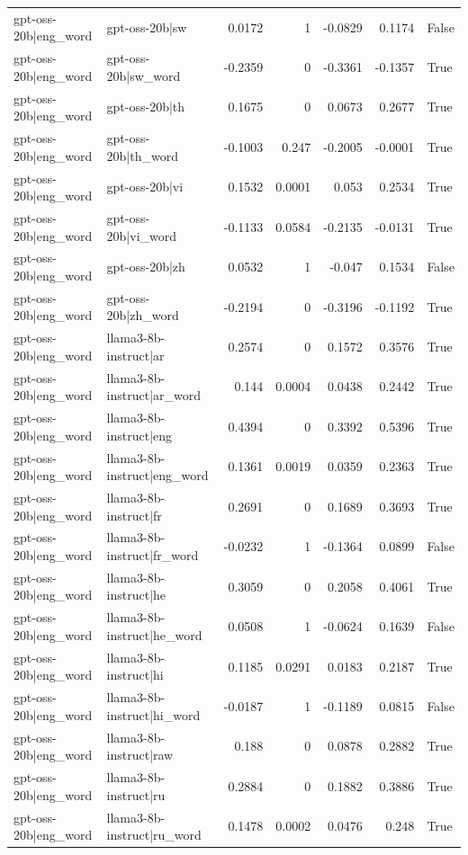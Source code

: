 \begin{table}
\begin{tabular}{l l r r r r l}
gpt-oss-20b|eng_word & gpt-oss-20b|sw & 0.0172 & 1 & -0.0829 & 0.1174 & False \\
gpt-oss-20b|eng_word & gpt-oss-20b|sw_word & -0.2359 & 0 & -0.3361 & -0.1357 & True \\
gpt-oss-20b|eng_word & gpt-oss-20b|th & 0.1675 & 0 & 0.0673 & 0.2677 & True \\
gpt-oss-20b|eng_word & gpt-oss-20b|th_word & -0.1003 & 0.247 & -0.2005 & -0.0001 & True \\
gpt-oss-20b|eng_word & gpt-oss-20b|vi & 0.1532 & 0.0001 & 0.053 & 0.2534 & True \\
gpt-oss-20b|eng_word & gpt-oss-20b|vi_word & -0.1133 & 0.0584 & -0.2135 & -0.0131 & True \\
gpt-oss-20b|eng_word & gpt-oss-20b|zh & 0.0532 & 1 & -0.047 & 0.1534 & False \\
gpt-oss-20b|eng_word & gpt-oss-20b|zh_word & -0.2194 & 0 & -0.3196 & -0.1192 & True \\
gpt-oss-20b|eng_word & llama3-8b-instruct|ar & 0.2574 & 0 & 0.1572 & 0.3576 & True \\
gpt-oss-20b|eng_word & llama3-8b-instruct|ar_word & 0.144 & 0.0004 & 0.0438 & 0.2442 & True \\
gpt-oss-20b|eng_word & llama3-8b-instruct|eng & 0.4394 & 0 & 0.3392 & 0.5396 & True \\
gpt-oss-20b|eng_word & llama3-8b-instruct|eng_word & 0.1361 & 0.0019 & 0.0359 & 0.2363 & True \\
gpt-oss-20b|eng_word & llama3-8b-instruct|fr & 0.2691 & 0 & 0.1689 & 0.3693 & True \\
gpt-oss-20b|eng_word & llama3-8b-instruct|fr_word & -0.0232 & 1 & -0.1364 & 0.0899 & False \\
gpt-oss-20b|eng_word & llama3-8b-instruct|he & 0.3059 & 0 & 0.2058 & 0.4061 & True \\
gpt-oss-20b|eng_word & llama3-8b-instruct|he_word & 0.0508 & 1 & -0.0624 & 0.1639 & False \\
gpt-oss-20b|eng_word & llama3-8b-instruct|hi & 0.1185 & 0.0291 & 0.0183 & 0.2187 & True \\
gpt-oss-20b|eng_word & llama3-8b-instruct|hi_word & -0.0187 & 1 & -0.1189 & 0.0815 & False \\
gpt-oss-20b|eng_word & llama3-8b-instruct|raw & 0.188 & 0 & 0.0878 & 0.2882 & True \\
gpt-oss-20b|eng_word & llama3-8b-instruct|ru & 0.2884 & 0 & 0.1882 & 0.3886 & True \\
gpt-oss-20b|eng_word & llama3-8b-instruct|ru_word & 0.1478 & 0.0002 & 0.0476 & 0.248 & True \\

\end{tabular}
\end{table}
